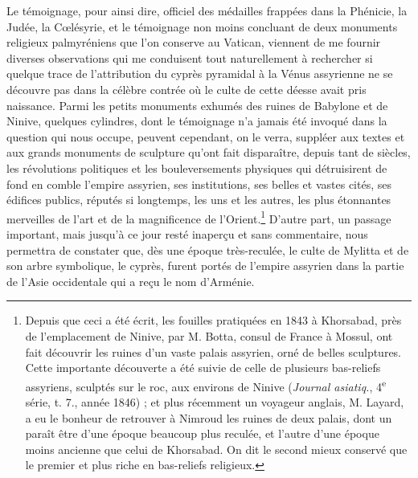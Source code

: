 \documentclass[a4paper, 11pt, oneside, polutonikogreek, french]{article}
\begin{document}
Le témoignage, pour ainsi dire, officiel des médailles frappées dans la Phénicie, la Judée, la Cœlésyrie, et le témoignage non moins concluant de deux monuments religieux palmyréniens que l'on conserve au Vatican, viennent de me fournir diverses observations qui me conduisent tout naturellement à rechercher si quelque trace de l'attribution du cyprès pyramidal à la Vénus assyrienne ne se découvre pas dans la célèbre contrée où le culte de cette déesse avait pris naissance. Parmi les petits monuments exhumés des ruines de Babylone et de Ninive, quelques cylindres, dont le témoignage n'a jamais été invoqué dans la question qui nous occupe, peuvent cependant, on le verra, suppléer aux textes et aux grands monuments de sculpture qu'ont fait disparaître, depuis tant de siècles, les révolutions politiques et les bouleversements physiques qui détruisirent de fond en comble l'empire assyrien, ses institutions, ses belles et vastes cités, ses édifices publics, réputés si longtemps, les uns et les autres, les plus étonnantes merveilles de l'art et de la magnificence de l'Orient.\footnote{Depuis que ceci a été écrit, les fouilles pratiquées en 1843 à Khorsabad, près de l'emplacement de Ninive, par M. Botta, consul de France à Mossul, ont fait découvrir les ruines d'un vaste palais assyrien, orné de belles sculptures. Cette importante découverte a été suivie de celle de plusieurs bas-reliefs assyriens, sculptés sur le roc, aux environs de Ninive (\emph{Journal asiatiq.}, 4\textsuperscript{e} série, t. 7., année 1846) ; et plus récemment un voyageur anglais, M. Layard, a eu le bonheur de retrouver à Nimroud les ruines de deux palais, dont un paraît être d'une époque beaucoup plus reculée, et l'autre d'une époque moins ancienne que celui de Khorsabad. On dit le second mieux conservé que le premier et plus riche en bas-reliefs religieux.} D'autre part, un passage important, mais jusqu'à ce jour resté inaperçu et sans commentaire, nous permettra de constater que, dès une époque très-reculée, le culte de Mylitta et de son arbre symbolique, le cyprès, furent portés de l'empire assyrien dans la partie de l'Asie occidentale qui a reçu le nom d'Arménie.
\end{document}
